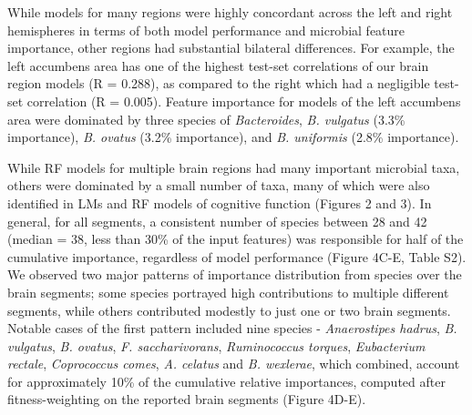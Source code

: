 \documentclass{article}
\begin{document}
While models for many regions were highly concordant across the
left and right hemispheres in terms of both model performance and
microbial feature importance, other regions had substantial
bilateral differences. For example, the left accumbens area
has one of the highest test-set correlations of our
brain region models (R = 0.288), as compared to the right which
had a negligible test-set correlation (R = 0.005).
Feature importance for models of the left accumbens area were dominated
by three species of \emph{Bacteroides}, \emph{B. vulgatus} (3.3\% importance),
\emph{B. ovatus} (3.2\% importance), and
\emph{B. uniformis} (2.8\% importance).

While RF models for multiple brain regions had many important microbial taxa,
others were dominated by a small number of taxa, many of which
were also identified in LMs and RF models of cognitive function (Figures 2 and 3). 
In general, for all segments, a consistent number of species between 28 and 42 (median = 38, less than 30\% of the input features)
was responsible for half of the cumulative importance,
regardless of model performance (Figure 4C-E, Table S2).
We observed two major patterns of importance distribution from
species over the brain segments; some species portrayed high contributions
to multiple different segments, while others contributed modestly to
just one or two brain segments. Notable cases of the first pattern
included nine species - 
\emph{Anaerostipes hadrus},
\emph{B. vulgatus},
\emph{B. ovatus},
\emph{F. saccharivorans},
\emph{Ruminococcus torques},
\emph{Eubacterium rectale},
\emph{Coprococcus comes},
\emph{A. celatus} and
\emph{B. wexlerae}, which combined, account for approximately 10\% of the cumulative relative importances,
computed after fitness-weighting on the reported brain segments (Figure 4D-E).
\end{document}

